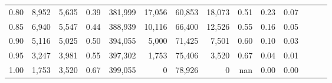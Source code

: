 \begin{tabular}{rrrrrrrrrrrrrr}
0.80 &   8,952 &  5,635 &  0.39 &  381,999 &   17,056 &  60,853 &  18,073 &  0.51 &  0.23 &      0.07 \\
0.85 &   6,940 &  5,547 &  0.44 &  388,939 &   10,116 &  66,400 &  12,526 &  0.55 &  0.16 &      0.05 \\
0.90 &   5,116 &  5,025 &  0.50 &  394,055 &    5,000 &  71,425 &   7,501 &  0.60 &  0.10 &      0.03 \\
0.95 &   3,247 &  3,981 &  0.55 &  397,302 &    1,753 &  75,406 &   3,520 &  0.67 &  0.04 &      0.01 \\
1.00 &   1,753 &  3,520 &  0.67 &  399,055 &        0 &  78,926 &       0 &   nan &  0.00 &      0.00 \\
\bottomrule
\end{tabular}

